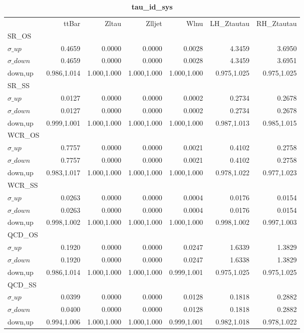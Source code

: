 \documentclass[11pt,oneside,a4paper]{article}
\begin{document}
\begin{table}
\centering
\caption{\bf{tau\_id\_sys}}
\begin{tabular}{lrrrrrr}
 & ttBar & Zltau & Zlljet & Wlnu & LH\_Ztautau & RH\_Ztautau \\
SR\_OS &  &  &  &  &  &  \\
$\sigma\_up$ & 0.4659 & 0.0000 & 0.0000 & 0.0028 & 4.3459 & 3.6950 \\
$\sigma\_down$ & 0.4659 & 0.0000 & 0.0000 & 0.0028 & 4.3459 & 3.6951 \\
down,up & 0.986,1.014 & 1.000,1.000 & 1.000,1.000 & 1.000,1.000 & 0.975,1.025 & 0.975,1.025 \\

\hline
SR\_SS &  &  &  &  &  &  \\
$\sigma\_up$ & 0.0127 & 0.0000 & 0.0000 & 0.0002 & 0.2734 & 0.2678 \\
$\sigma\_down$ & 0.0127 & 0.0000 & 0.0000 & 0.0002 & 0.2734 & 0.2678 \\
down,up & 0.999,1.001 & 1.000,1.000 & 1.000,1.000 & 1.000,1.000 & 0.987,1.013 & 0.985,1.015 \\

\hline
WCR\_OS &  &  &  &  &  &  \\
$\sigma\_up$ & 0.7757 & 0.0000 & 0.0000 & 0.0021 & 0.4102 & 0.2758 \\
$\sigma\_down$ & 0.7757 & 0.0000 & 0.0000 & 0.0021 & 0.4102 & 0.2758 \\
down,up & 0.983,1.017 & 1.000,1.000 & 1.000,1.000 & 1.000,1.000 & 0.978,1.022 & 0.977,1.023 \\

\hline
WCR\_SS &  &  &  &  &  &  \\
$\sigma\_up$ & 0.0263 & 0.0000 & 0.0000 & 0.0004 & 0.0176 & 0.0154 \\
$\sigma\_down$ & 0.0263 & 0.0000 & 0.0000 & 0.0004 & 0.0176 & 0.0154 \\
down,up & 0.998,1.002 & 1.000,1.000 & 1.000,1.000 & 1.000,1.000 & 0.998,1.002 & 0.997,1.003 \\

\hline
QCD\_OS &  &  &  &  &  &  \\
$\sigma\_up$ & 0.1920 & 0.0000 & 0.0000 & 0.0247 & 1.6339 & 1.3829 \\
$\sigma\_down$ & 0.1920 & 0.0000 & 0.0000 & 0.0247 & 1.6338 & 1.3829 \\
down,up & 0.986,1.014 & 1.000,1.000 & 1.000,1.000 & 0.999,1.001 & 0.975,1.025 & 0.975,1.025 \\

\hline
QCD\_SS &  &  &  &  &  &  \\
$\sigma\_up$ & 0.0399 & 0.0000 & 0.0000 & 0.0128 & 0.1818 & 0.2882 \\
$\sigma\_down$ & 0.0400 & 0.0000 & 0.0000 & 0.0128 & 0.1818 & 0.2882 \\
down,up & 0.994,1.006 & 1.000,1.000 & 1.000,1.000 & 0.999,1.001 & 0.982,1.018 & 0.978,1.022 \\

\hline
\end{tabular}
\end{table}
\end{document}
